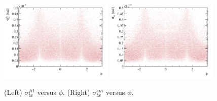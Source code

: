 %
\begin{figure}[h!]
\centering
\includegraphics[width=0.48\textwidth]{figs/etx-phi-fit.pdf}
\includegraphics[width=0.48\textwidth]{figs/etx-phi-em.pdf}
\caption{(Left) $\sigma^{fit}_{tx}$ versus $\phi$. (Right)
  $\sigma^{em}_{tx}$ versus $\phi$.}
\label{fig:emtxphi}
\end{figure}
%

